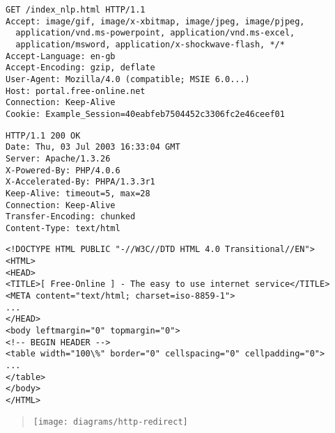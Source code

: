 \documentclass{sepslide-soa-faked} %
\begin{document}
\begin{slide}
\begin{verbatim}
GET /index_nlp.html HTTP/1.1
Accept: image/gif, image/x-xbitmap, image/jpeg, image/pjpeg, 
  application/vnd.ms-powerpoint, application/vnd.ms-excel, 
  application/msword, application/x-shockwave-flash, */*
Accept-Language: en-gb
Accept-Encoding: gzip, deflate
User-Agent: Mozilla/4.0 (compatible; MSIE 6.0...)
Host: portal.free-online.net
Connection: Keep-Alive
Cookie: Example_Session=40eabfeb7504452c3306fc2e46ceef01
\end{verbatim}
\end{slide}

\begin{slide}
\begin{verbatim}
HTTP/1.1 200 OK
Date: Thu, 03 Jul 2003 16:33:04 GMT
Server: Apache/1.3.26
X-Powered-By: PHP/4.0.6
X-Accelerated-By: PHPA/1.3.3r1
Keep-Alive: timeout=5, max=28
Connection: Keep-Alive
Transfer-Encoding: chunked
Content-Type: text/html
\end{verbatim}
\end{slide}

\begin{slide}
\begin{verbatim}
<!DOCTYPE HTML PUBLIC "-//W3C//DTD HTML 4.0 Transitional//EN">
<HTML>
<HEAD>
<TITLE>[ Free-Online ] - The easy to use internet service</TITLE>
<META content="text/html; charset=iso-8859-1">
...
</HEAD>
<body leftmargin="0" topmargin="0">
<!-- BEGIN HEADER -->
<table width="100\%" border="0" cellspacing="0" cellpadding="0">
...
</table>
</body>
</HTML>
\end{verbatim}
\end{slide}

\begin{slide}
\begin{quote}
\texttt{[image: diagrams/http-redirect]}
\end{quote}
\end{slide}

\end{document}

